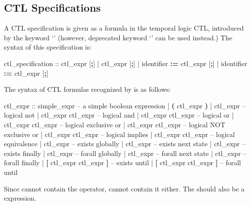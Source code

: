 \subsection{CTL Specifications}
\label{CTL Specifications}
%
A CTL specification is given as a formula in the temporal logic CTL,
introduced by the keyword `' (however, deprecated
keyword `' can be used instead.)
%
The syntax of this specification is:
%
\begin{Grammar}
ctl_specification ::  ctl_expr [\textbf{;}]
                   |  ctl_expr [\textbf{;}]
                   |   identifier \textbf{:=} ctl_expr [\textbf{;}]
                   |   identifier \textbf{:=} ctl_expr [\textbf{;}]

\end{Grammar}
%
The syntax of CTL formulas recognized by \nusmv is as follows:
%
\begin{Grammar}
ctl_expr ::
    simple_expr                 -- a simple boolean expression
    | \textbf{(} ctl_expr \textbf{)}
    | \operator{!} ctl_expr                -- logical not
    | ctl_expr \operator{\&} ctl_expr       -- logical and
    | ctl_expr \operator{|} ctl_expr       -- logical or
    | ctl_expr  ctl_expr     -- logical exclusive or
    | ctl_expr  ctl_expr    -- logical NOT exclusive or
    | ctl_expr \operator{->} ctl_expr      -- logical implies
    | ctl_expr \operator{<->} ctl_expr     -- logical equivalence
    |  ctl_expr               -- exists globally
    |  ctl_expr               -- exists next state
    |  ctl_expr               -- exists finally
    |  ctl_expr               -- forall globally
    |  ctl_expr               -- forall next state
    |  ctl_expr               -- forall finally
    |  \textbf{[} ctl_expr  ctl_expr \textbf{]} -- exists until
    |  \textbf{[} ctl_expr  ctl_expr \textbf{]} -- forall until
\end{Grammar}
%
Since  cannot contain the 
operator,  cannot contain it either.
%
The  should also be a \Boolean expression.

